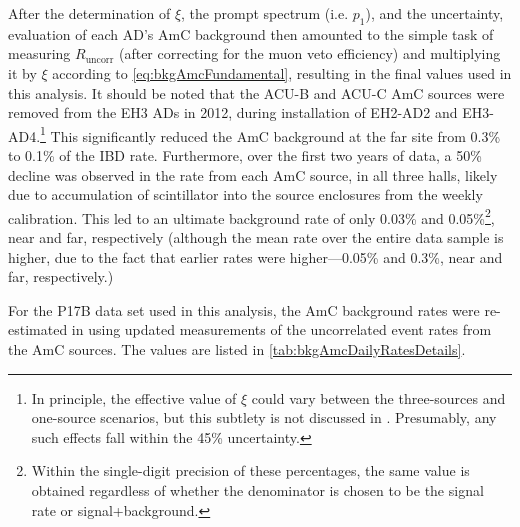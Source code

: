 \documentclass[../thesis.tex]{subfiles}
\begin{document}
After the determination of $\xi$, the prompt spectrum (i.e. $p_1$), and the uncertainty, evaluation of each AD's AmC background then amounted to the simple task of measuring $R_{\mathrm{uncorr}}$ (after correcting for the muon veto efficiency) and multiplying it by $\xi$ according to \autoref{eq:bkgAmcFundamental}, resulting in the final values used in this analysis. It should be noted that the ACU-B and ACU-C AmC sources were removed from the EH3 ADs in 2012, during installation of EH2-AD2 and EH3-AD4.\footnote{In principle, the effective value of $\xi$ could vary between the three-sources and one-source scenarios, but this subtlety is not discussed in \cite{Gu_2016}. Presumably, any such effects fall within the 45\% uncertainty.} This significantly reduced the AmC background at the far site from 0.3\% to 0.1\% of the IBD rate. Furthermore, over the first two years of data, a 50\% decline was observed in the rate from each AmC source, in all three halls, likely due to accumulation of scintillator into the source enclosures from the weekly calibration. This led to an ultimate background rate of only 0.03\% and 0.05\%\footnote{Within the single-digit precision of these percentages, the same value is obtained regardless of whether the denominator is chosen to be the signal rate or signal+background.}, near and far, respectively (although the mean rate over the entire data sample is higher, due to the fact that earlier rates were higher---0.05\% and 0.3\%, near and far, respectively.)

For the P17B data set used in this analysis, the AmC background rates were re-estimated in \cite{lianghongBkg} using updated measurements of the uncorrelated event rates from the AmC sources. The values are listed in \autoref{tab:bkgAmcDailyRatesDetails}.

\begin{table}[ht]
  \caption{AmC background rates for the P17B data set \cite{lianghongBkg}.}
  \label{tab:bkgAmcDailyRatesDetails}
\end{table}
\end{document}
